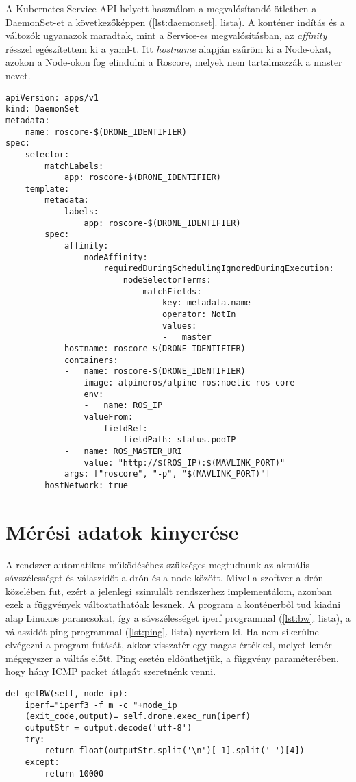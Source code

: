 \noindent
A Kubernetes Service API helyett használom a megvalósítandó ötletben a DaemonSet-et a következőképpen (\ref{lst:daemonset}. lista). A konténer indítás és a változók ugyanazok maradtak, mint a Service-es megvalósításban, az \emph{affinity} résszel egészítettem ki a yaml-t. Itt \emph{hostname} alapján szűröm ki a Node-okat, azokon a Node-okon fog elindulni a Roscore, melyek nem tartalmazzák a master nevet.

\begin{lstlisting}[caption={DaemonSet megvalósítás, Roscore minden worker-en}, label={lst:daemonset}]
apiVersion: apps/v1
kind: DaemonSet
metadata:
	name: roscore-$(DRONE_IDENTIFIER)
spec:
	selector:
		matchLabels:
			app: roscore-$(DRONE_IDENTIFIER)
	template:
		metadata:
			labels:
				app: roscore-$(DRONE_IDENTIFIER)
		spec:
			affinity:
				nodeAffinity:
					requiredDuringSchedulingIgnoredDuringExecution:
						nodeSelectorTerms:
						-	matchFields:
							-	key: metadata.name
								operator: NotIn
								values:
								-	master
			hostname: roscore-$(DRONE_IDENTIFIER)
			containers:
			-	name: roscore-$(DRONE_IDENTIFIER)
				image: alpineros/alpine-ros:noetic-ros-core 
				env:
				-	name: ROS_IP
				valueFrom:
					fieldRef:
						fieldPath: status.podIP
			-	name: ROS_MASTER_URI
				value: "http://$(ROS_IP):$(MAVLINK_PORT)"
			args: ["roscore", "-p", "$(MAVLINK_PORT)"]
		hostNetwork: true
\end{lstlisting}

\section{Mérési adatok kinyerése}
A rendszer automatikus működéséhez szükséges megtudnunk az aktuális sávszélességet és válaszidőt a drón és a node között. Mivel a szoftver a drón közelében fut, ezért a jelenlegi szimulált rendszerhez implementálom, azonban ezek a függvények változtathatóak lesznek. A program a konténerből tud kiadni alap Linuxos parancsokat, így a sávszélességet iperf programmal (\ref{lst:bw}. lista), a válaszidőt ping programmal (\ref{lst:ping}. lista)  nyertem ki. Ha nem sikerülne elvégezni a program futását, akkor visszatér egy magas értékkel, melyet lemér mégegyszer a váltás előtt. Ping esetén eldönthetjük, a függvény paraméterében, hogy hány ICMP packet átlagát szeretnénk venni.

\begin{lstlisting}[caption={Sávszélesség megállapítása a konténer és a node között}, label={lst:bw}]
def getBW(self, node_ip):
	iperf="iperf3 -f m -c "+node_ip
	(exit_code,output)= self.drone.exec_run(iperf)
	outputStr = output.decode('utf-8')
	try:
		return float(outputStr.split('\n')[-1].split(' ')[4])
	except:
		return 10000
\end{lstlisting}

